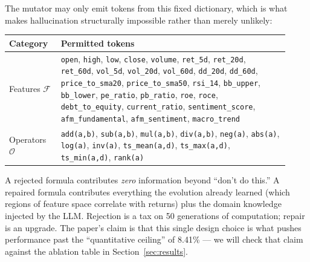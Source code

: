 \documentclass[11pt,a4paper]{article}
\newcommand{\code}[1]{\texttt{#1}}
\begin{document}
\begin{themath}
The mutator may only emit tokens from this fixed dictionary, which is what
makes hallucination structurally impossible rather than merely unlikely:
\begin{center}\small
\begin{tabular}{@{}p{0.17\linewidth}p{0.75\linewidth}@{}}
\toprule
\textbf{Category} & \textbf{Permitted tokens} \\
\midrule
Features $\mathcal{F}$ &
  \code{open}, \code{high}, \code{low}, \code{close}, \code{volume},
  \code{ret\_5d}, \code{ret\_20d}, \code{ret\_60d}, \code{vol\_5d},
  \code{vol\_20d}, \code{vol\_60d}, \code{dd\_20d}, \code{dd\_60d},
  \code{price\_to\_sma20}, \code{price\_to\_sma50}, \code{rsi\_14},
  \code{bb\_upper}, \code{bb\_lower}, \code{pe\_ratio}, \code{pb\_ratio},
  \code{roe}, \code{roce}, \code{debt\_to\_equity}, \code{current\_ratio},
  \code{sentiment\_score}, \code{afm\_fundamental}, \code{afm\_sentiment},
  \code{macro\_trend} \\
Operators $\mathcal{O}$ &
  \code{add(a,b)}, \code{sub(a,b)}, \code{mul(a,b)}, \code{div(a,b)},
  \code{neg(a)}, \code{abs(a)}, \code{log(a)}, \code{inv(a)},
  \code{ts\_mean(a,d)}, \code{ts\_max(a,d)}, \code{ts\_min(a,d)},
  \code{rank(a)} \\
\bottomrule
\end{tabular}
\end{center}
\end{themath}

\begin{scrutiny}
A rejected formula contributes \emph{zero} information beyond ``don't do
this.'' A repaired formula contributes everything the evolution already
learned (which regions of feature space correlate with returns) plus the
domain knowledge injected by the LLM. Rejection is a tax on 50 generations of
computation; repair is an upgrade. The paper's claim is that this single
design choice is what pushes performance past the ``quantitative ceiling''
of 8.41\% --- we will check that claim against the ablation table in
Section~\ref{sec:results}.
\end{scrutiny}
\end{document}
